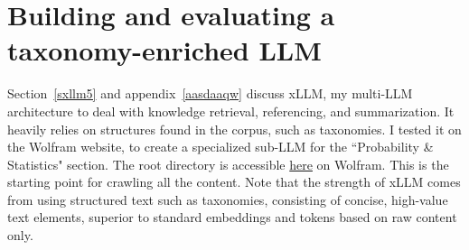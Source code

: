 \documentclass[oneside,10pt]{book}
\begin{document}

\section{Building and evaluating a taxonomy-enriched LLM}\label{sec822}

Section~\ref{sxllm5} and appendix~\ref{aasdaaqw} discuss \textcolor{index}{xLLM}, my multi-LLM architecture to deal with knowledge retrieval, referencing,  and summarization. It heavily relies on structures found in the corpus,
 such as taxonomies. I tested it on the Wolfram website, to create a specialized sub-LLM for the ``Probability \& Statistics" section. The  root directory is accessible  
\href{https://mathworld.wolfram.com/topics/ProbabilityandStatistics.html}{here} on Wolfram. This is the starting point for crawling all the content. 
Note that the strength of xLLM comes from using structured text such as taxonomies, consisting of concise, high-value text elements, 
 superior to standard embeddings and tokens based on raw content only.
\end{document}
